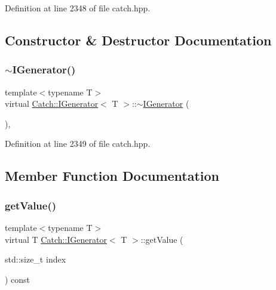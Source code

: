 Definition at line 2348 of file catch.\+hpp.



\subsection{Constructor \& Destructor Documentation}
\hypertarget{struct_catch_1_1_i_generator_a0622037f4617e09aa8c584b0144d4a1a}{}\label{struct_catch_1_1_i_generator_a0622037f4617e09aa8c584b0144d4a1a} 
\subsubsection{\texorpdfstring{$\sim$\+I\+Generator()}{~IGenerator()}}
{\footnotesize\ttfamily template$<$typename T$>$ \\
virtual \hyperlink{struct_catch_1_1_i_generator}{Catch\+::\+I\+Generator}$<$ T $>$\+::$\sim$\hyperlink{struct_catch_1_1_i_generator}{I\+Generator} (\begin{DoxyParamCaption}{ }\end{DoxyParamCaption})\hspace{0.3cm}{\ttfamily [inline]}, {\ttfamily [virtual]}}



Definition at line 2349 of file catch.\+hpp.



\subsection{Member Function Documentation}
\hypertarget{struct_catch_1_1_i_generator_ad69e937cb66dba3ed9429c42abf4fce3}{}\label{struct_catch_1_1_i_generator_ad69e937cb66dba3ed9429c42abf4fce3} 
\subsubsection{\texorpdfstring{get\+Value()}{getValue()}}
{\footnotesize\ttfamily template$<$typename T$>$ \\
virtual T \hyperlink{struct_catch_1_1_i_generator}{Catch\+::\+I\+Generator}$<$ T $>$\+::get\+Value (\begin{DoxyParamCaption}\item[{std\+::size\+\_\+t}]{index }\end{DoxyParamCaption}) const\hspace{0.3cm}{\ttfamily [pure virtual]}}



